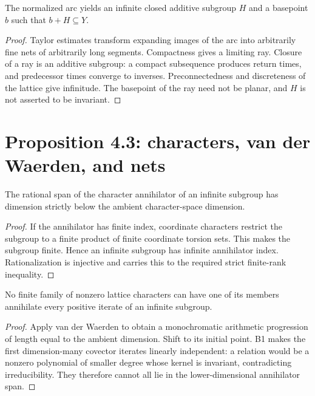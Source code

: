 \begin{proposition}
  \label{prop:ray-subgroup}
  \leanok
  The normalized arc yields an infinite closed additive subgroup \(H\) and a
  basepoint \(b\) such that \(b+H\subseteq Y\).
\end{proposition}
\begin{proof}
  Taylor estimates transform expanding images of the arc into arbitrarily fine
  nets of arbitrarily long segments. Compactness gives a limiting ray. Closure
  of a ray is an additive subgroup: a compact subsequence produces return times,
  and predecessor times converge to inverses. Preconnectedness and discreteness
  of the lattice give infinitude. The basepoint of the ray need not be planar,
  and \(H\) is not asserted to be invariant.
\end{proof}

\section{Proposition 4.3: characters, van der Waerden, and nets}

\begin{lemma}
  \label{lem:annihilator-rank}
  \leanok
  The rational span of the character annihilator of an infinite subgroup has
  dimension strictly below the ambient character-space dimension.
\end{lemma}
\begin{proof}
  If the annihilator has finite index, coordinate characters restrict the
  subgroup to a finite product of finite coordinate torsion sets. This makes
  the subgroup finite. Hence an infinite subgroup has infinite annihilator
  index. Rationalization is injective and carries this to the required strict
  finite-rank inequality.
\end{proof}

\begin{lemma}
  \label{lem:no-character-cover}
  \leanok
  No finite family of nonzero lattice characters can have one of its members
  annihilate every positive iterate of an infinite subgroup.
\end{lemma}
\begin{proof}
  Apply van der Waerden to obtain a monochromatic arithmetic progression of
  length equal to the ambient dimension. Shift to its initial point. B1 makes
  the first dimension-many covector iterates linearly independent: a relation
  would be a nonzero polynomial of smaller degree whose kernel is invariant,
  contradicting irreducibility. They therefore cannot all lie in the
  lower-dimensional annihilator span.
\end{proof}

